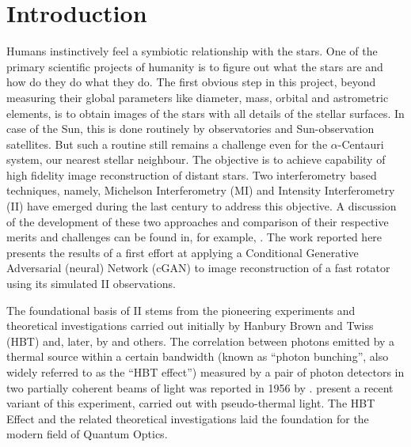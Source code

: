 \section{Introduction}
Humans instinctively feel a symbiotic relationship with the stars. One of the primary scientific projects of humanity is to figure out what the stars are and how do they do what they do. The first obvious step in this project, beyond measuring their global parameters like diameter, mass, orbital and astrometric elements, is to obtain images of the stars with all details of the stellar surfaces. In case of the Sun, this is done routinely by observatories and Sun-observation satellites. But such a routine still remains a challenge even for the $\alpha$-Centauri system, our nearest stellar neighbour. The objective is to achieve capability of high fidelity image reconstruction of distant stars. Two interferometry based techniques, namely, Michelson Interferometry (MI) and Intensity Interferometry (II) have emerged during the last century to address this objective. A discussion of the development of these two approaches and comparison of their respective merits and challenges can be found in, for example, \cite{Rai2025}. The work reported here presents the results of a first effort at applying a Conditional Generative Adversarial (neural) Network (cGAN) to image reconstruction of a fast rotator using its simulated II observations.  

The foundational basis of II stems from the pioneering experiments and theoretical investigations carried out initially by Hanbury Brown and Twiss (HBT) \citep{HBT56Lab,brown1957interferometry, brown1958interferometry} and, later, by \cite{glauber1963quantum} and others. The correlation between photons emitted by a thermal source within a certain bandwidth (known as ``photon bunching'', also widely referred to as the \textquotedblleft HBT effect\textquotedblright) measured by a pair of photon detectors in two partially coherent beams of light was reported in 1956 by \cite{HBT56Lab}. \cite{Rai2025} present a recent variant of this experiment, carried out with pseudo-thermal light. The HBT Effect and the related theoretical investigations laid the foundation for the modern field of Quantum Optics.

